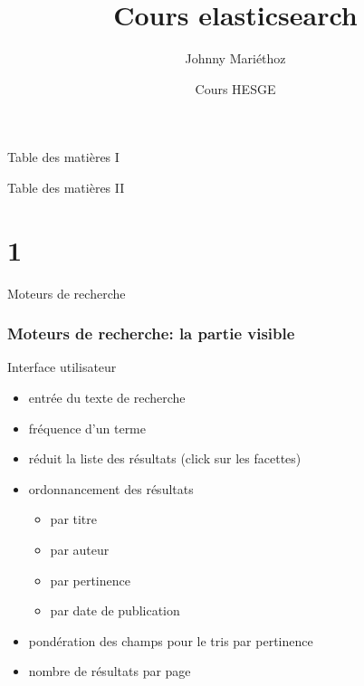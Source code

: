 \documentclass[hangout]{beamer}
\title[ES lab]{Cours elasticsearch}
\author{Johnny Mari\'ethoz}
\institute{RERO}
\date[Genève 2014]{Cours HESGE}
\begin{document}
\maketitle

\begin{frame}{Table des matières I}
	\tableofcontents[part=1]
	\tableofcontents[part=2]
\end{frame}
\begin{frame}{Table des matières II}
	\tableofcontents[part=3]
	\tableofcontents[part=4]
\end{frame}

\part{1}
\begin{frame}{Moteurs de recherche}
	\tableofcontents[part=1]
\end{frame}
\section{Moteurs de recherche: la partie visible}

\begin{frame}
	\begin{block}{Interface utilisateur}
	\begin{itemize}
	    \item {} entrée du texte de recherche
	    \item {} fréquence d'un \alert{terme}
	    \item {} \alert{réduit} la liste des résultats (click sur les facettes)
	    \item {} ordonnancement des résultats
	    	\begin{itemize}
	    		\item par titre
	    		\item par auteur
	    		\item par \alert{pertinence}
	    		\item par date de publication
	    	\end{itemize}
	    \item {} pondération des champs pour le tris par pertinence
	    \item {} nombre de résultats par page
	\end{itemize}
	
	\end{block}
\end{frame}
\end{document}
